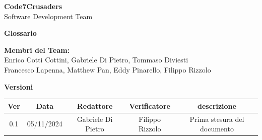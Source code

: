 \documentclass[italian,12pt]{article}
\begin{document}
\begin{titlepage}
    {\Huge \textbf{Code7Crusaders}}\\
    \vspace{0.5cm}
    {\Large Software Development Team}\\
    \vspace{2cm}
    
    \large \textbf{Glossario}
    \vspace{3.9cm}

    \textbf{Membri del Team:}\\
    Enrico Cotti Cottini, Gabriele Di Pietro, Tommaso Diviesti \\
    Francesco Lapenna, Matthew Pan, Eddy Pinarello, Filippo Rizzolo \\
    \vspace{0.5cm}
    
    \vspace{1cm}
\end{titlepage}

\newpage
\begin{center}
    \textbf{Versioni}
    \\
    \vspace{0.3cm}
    \begin{tabular}{|c|c|c|c|c|}
        \hline
        \textbf{Ver} & \textbf{Data} & \textbf{Redattore} & \textbf{Verificatore} & \textbf{descrizione}\\
        \hline
        0.1 & 05/11/2024 & Gabriele Di Pietro & Filippo Rizzolo & Prima stesura del documento \\
        \hline
    \end{tabular}
\end{center}
\newpage

\tableofcontents

\printglossary[style=myaltlistgroup,title=]
\end{document}
